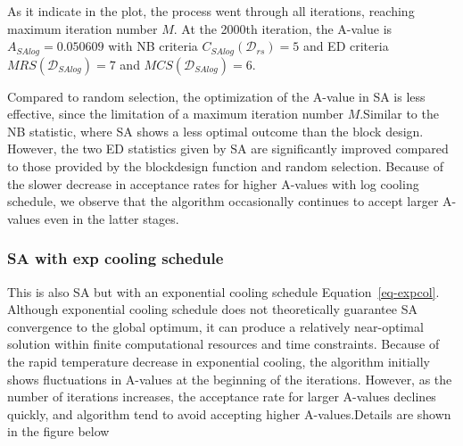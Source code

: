 \documentclass[
  a4paper,
  oneside,
  openany,
  12pt,
  onecolumn]{book}
\theoremstyle{definition}
\theoremstyle{plain}
\theoremstyle{remark}
\begin{document}
As it indicate in the plot, the process went through all iterations,
reaching maximum iteration number \(M\). At the 2000th iteration, the
A-value is \(A_{SAlog}=0.050609\) with NB criteria
\(C_{SAlog}(\mathcal{D}_{rs})=5\) and ED criteria
\(MRS(\mathcal{D}_{SAlog})=7\) and \(MCS(\mathcal{D}_{SAlog})=6\).

Compared to random selection, the optimization of the A-value in SA is
less effective, since the limitation of a maximum iteration number
\(M\).Similar to the NB statistic, where SA shows a less optimal outcome
than the block design. However, the two ED statistics given by SA are
significantly improved compared to those provided by the blockdesign
function and random selection. Because of the slower decrease in
acceptance rates for higher A-values with log cooling schedule, we
observe that the algorithm occasionally continues to accept larger
A-values even in the latter stages.

\subsubsection{SA with exp cooling
schedule}\label{sa-with-exp-cooling-schedule}

This is also SA but with an exponential cooling schedule
Equation~\ref{eq-expcol}. Although exponential cooling schedule does not
theoretically guarantee SA convergence to the global optimum, it can
produce a relatively near-optimal solution within finite computational
resources and time constraints. Because of the rapid temperature
decrease in exponential cooling, the algorithm initially shows
fluctuations in A-values at the beginning of the iterations. However, as
the number of iterations increases, the acceptance rate for larger
A-values declines quickly, and algorithm tend to avoid accepting higher
A-values.Details are shown in the figure below
\end{document}
